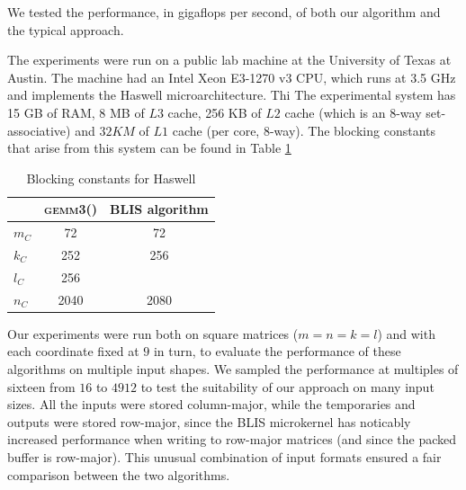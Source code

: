 \documentclass[12pt]{article}
\newcommand*{\gemmt}{{\textsc{gemm3()}}}
\begin{document}
We tested the performance, in gigaflops per second, of both our algorithm and the typical approach.

The experiments were run on a public lab machine at the University of Texas at Austin.
The machine had an Intel Xeon E3-1270 v3 CPU, which runs at 3.5 GHz and implements the Haswell microarchitecture.
Thi
The experimental system has 15 GB of RAM, 8 MB of $L3$ cache, 256 KB of $L2$ cache (which is an 8-way set-associative) and $32 KM$ of $L1$ cache (per core, 8-way).
The blocking constants that arise from this system can be found in Table \ref{tab:constants}

\begin{table}
  \centering
  \begin{tabular}{l|c c}
    &\gemmt{}&BLIS algorithm\\ \hline
    $m_C$&72&72\\
    $k_C$&252&256\\
    $l_C$&256&\\
    $n_C$&2040&2080\\
  \end{tabular}
  \caption{Blocking constants for Haswell}
  \label{tab:constants}
\end{table}

Our experiments were run both on square matrices ($m = n = k = l$) and with each coordinate fixed at $9$ in turn, to evaluate the performance of these algorithms on multiple input shapes.
We sampled the performance at multiples of sixteen from $16$ to $4912$ to test the suitability of our approach on many input sizes.
All the inputs were stored column-major, while the temporaries and outputs were stored row-major, since the BLIS microkernel has noticably increased performance when writing to row-major matrices (and since the packed buffer is row-major).
This unusual combination of input formats ensured a fair comparison between the two algorithms.
\end{document}
